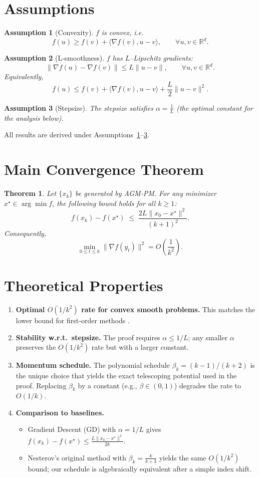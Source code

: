 \documentclass[11pt]{article}
\newtheorem{theorem}{Theorem}
\newtheorem{assumption}{Assumption}
\newcommand{\R}{\mathbb{R}}
\begin{document}
\newpage
\section*{Assumptions}
\begin{assumption}[Convexity]\label{as:convex}
$f$ is convex, i.e.
\[
f(u)\ge f(v)+\langle\nabla f(v),u-v\rangle,\qquad\forall u,v\in\R^{d}.
\]
\end{assumption}
\begin{assumption}[L‑smoothness]\label{as:smooth}
$f$ has $L$–Lipschitz gradients:
\[
\|\nabla f(u)-\nabla f(v)\|\le L\|u-v\|,\qquad\forall u,v\in\R^{d}.
\]
Equivalently,
\[
f(u)\le f(v)+\langle\nabla f(v),u-v\rangle+\frac{L}{2}\|u-v\|^{2}.
\]
\end{assumption}
\begin{assumption}[Stepsize]\label{as:step}
The stepsize satisfies $\displaystyle \alpha=\frac{1}{L}$ (the optimal constant for the analysis below).
\end{assumption}
All results are derived under Assumptions~\ref{as:convex}–\ref{as:step}.

\section*{Main Convergence Theorem}
\begin{theorem}\label{thm:rate}
Let $\{x_k\}$ be generated by AGM‑PM. For any minimizer $x^{\star}\in\arg\min f$, the following bound holds for all $k\ge 1$:
\[
f(x_k)-f(x^{\star})\;\le\; \frac{2L\|x_0-x^{\star}\|^{2}}{(k+1)^{2}}.
\]
Consequently,
\[
\min_{0\le t\le k} \|\nabla f(y_t)\|^{2}=O\!\left(\frac{1}{k^{2}}\right).
\]
\end{theorem}

\section*{Theoretical Properties}
\begin{enumerate}[label=\arabic*.]
\item \textbf{Optimal $O(1/k^{2})$ rate for convex smooth problems.} This matches the lower bound for first‑order methods \cite{Nesterov1983}.
\item \textbf{Stability w.r.t.\ stepsize.} The proof requires $\alpha\le 1/L$; any smaller $\alpha$ preserves the $O(1/k^{2})$ rate but with a larger constant.
\item \textbf{Momentum schedule.} The polynomial schedule $\beta_k=(k-1)/(k+2)$ is the unique choice that yields the exact telescoping potential used in the proof. Replacing $\beta_k$ by a constant (e.g., $\beta\in(0,1)$) degrades the rate to $O(1/k)$.
\item \textbf{Comparison to baselines.}
\begin{itemize}
\item Gradient Descent (GD) with $\alpha=1/L$ gives $f(x_k)-f(x^{\star})\le \frac{L\|x_0-x^{\star}\|^{2}}{2k}$.
\item Nesterov’s original method with $\beta_k=\frac{k}{k+3}$ yields the same $O(1/k^{2})$ bound; our schedule is algebraically equivalent after a simple index shift.
\end{itemize}
\end{enumerate}
\end{document}
